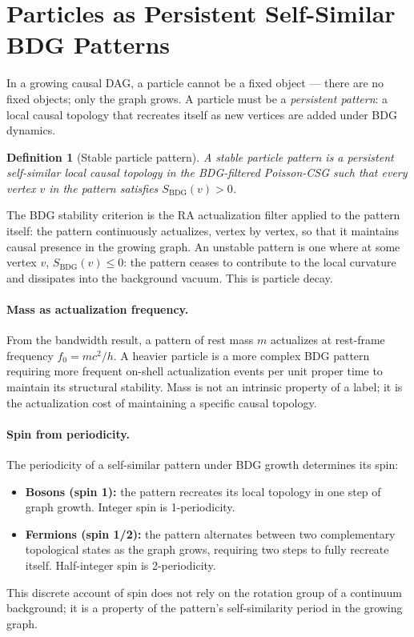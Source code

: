 \documentclass[11pt,a4paper]{article}
\newtheorem{definition}[theorem]{Definition}
\newcommand{\SBDG}{S_{\mathrm{BDG}}}
\begin{document}
\section{Particles as Persistent Self-Similar BDG Patterns}
\label{sec:particles}

In a growing causal DAG, a particle cannot be a fixed object --- there are no
fixed objects; only the graph grows. A particle must be a \emph{persistent
pattern}: a local causal topology that recreates itself as new vertices are
added under BDG dynamics.

\begin{definition}[Stable particle pattern]
A stable particle pattern is a persistent self-similar local causal topology
in the BDG-filtered Poisson-CSG such that every vertex $v$ in the pattern
satisfies $\SBDG(v) > 0$.
\end{definition}

The BDG stability criterion is the RA actualization filter applied to the
pattern itself: the pattern continuously actualizes, vertex by vertex, so that
it maintains causal presence in the growing graph. An unstable pattern is one
where at some vertex $v$, $\SBDG(v) \leq 0$: the pattern ceases to contribute
to the local curvature and dissipates into the background vacuum. This is
particle decay.

\paragraph{Mass as actualization frequency.}
From the bandwidth result, a pattern of rest mass $m$ actualizes at rest-frame
frequency $f_0 = mc^2/h$. A heavier particle is a more complex BDG pattern
requiring more frequent on-shell actualization events per unit proper time to
maintain its structural stability. Mass is not an intrinsic property of a
label; it is the actualization cost of maintaining a specific causal topology.

\paragraph{Spin from periodicity.}
The periodicity of a self-similar pattern under BDG growth determines its spin:
\begin{itemize}[noitemsep]
  \item \textbf{Bosons (spin 1):} the pattern recreates its local topology
  in one step of graph growth. Integer spin is 1-periodicity.
  \item \textbf{Fermions (spin 1/2):} the pattern alternates between two
  complementary topological states as the graph grows, requiring two steps
  to fully recreate itself. Half-integer spin is 2-periodicity.
\end{itemize}
This discrete account of spin does not rely on the rotation group of a
continuum background; it is a property of the pattern's self-similarity
period in the growing graph.
\end{document}

